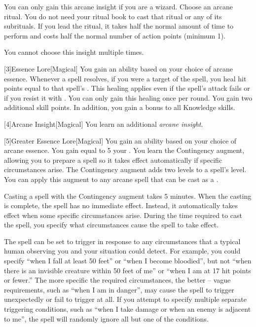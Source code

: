{             You can only gain this arcane insight if you are a wizard.
            Choose an arcane ritual.
            You do not need your ritual book to cast that ritual or any of its subrituals.
            If you lead the ritual, it takes half the normal amount of time to perform and costs half the normal number of action points (minimum 1).
            \par You cannot choose this insight multiple times.
        }

        [3]{Essence Lore}[Magical]
        You gain an ability based on your choice of arcane essence.
         Whenever a spell resolves, if you were a target of the spell, you heal hit points equal to that spell's .
        This healing applies even if the spell's attack fails or if you resist it with .
        You can only gain this healing once per round.
         You gain two additional skill points.
        In addition, you gain a  bonus to all Knowledge skills.

        [4]{Arcane Insight}[Magical]
        You learn an additional \textit{arcane insight}.

        [5]{Greater Essence Lore}[Magical]
        You gain an ability based on your choice of arcane essence.
         You gain  equal to 5 \add your .
         You learn the Contingency augment, allowing you to prepare a spell so it takes effect automatically if specific circumstances arise.
        The Contingency augment adds two levels to a spell's level.
        You can apply this augment to any arcane spell that can be cast as a .

        Casting a spell with the Contingency augment takes 5 minutes.
        When the casting is complete, the spell has no immediate effect.
        Instead, it automatically takes effect when some specific circumstances arise.
        During the time required to cast the spell, you specify what circumstances cause the spell to take effect.

        The spell can be set to trigger in response to any circumstances that a typical human observing you and your situation could detect.
        For example, you could specify ``when I fall at least 50 feet'' or ``when I become bloodied'', but not ``when there is an invisible creature within 50 feet of me'' or ``when I am at 17 hit points or fewer.''
        The more specific the required circumstances, the better -- vague requirements, such as ``when I am in danger'', may cause the spell to trigger unexpectedly or fail to trigger at all.
        If you attempt to specify multiple separate triggering conditions, such as ``when I take damage or when an enemy is adjacent to me'', the spell will randomly ignore all but one of the conditions.

